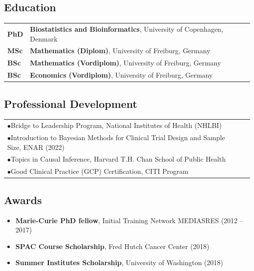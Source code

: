 \documentclass[a4paper,11pt]{article}
\def\he{\hspace{1ex}}
\begin{document}
\vspace{-0.3cm}
\subsection*{\large Education}\vspace{-0.2ex}
\he\begin{tabular}{ll p{6cm}}
	{\bf PhD} & {\bf Biostatistics and Bioinformatics}, University of Copenhagen, Denmark\\[0.2ex]
	{\bf MSc} & {\bf Mathematics (Diplom)}, University of Freiburg, Germany \\[0.2ex]
	{\bf BSc} & {\bf Mathematics (Vordiplom)}, University of Freiburg, Germany \\[0.2ex]
	{\bf BSc} & {\bf Economics (Vordiplom)}, University of Freiburg, Germany
\end{tabular}

\vspace{-0.3cm}
\subsection*{\large Professional Development}\vspace{-0.5ex}
\he\begin{tabular}{l p{6cm}}
$\bullet$\he Bridge to Leadership Program, National Institutes of Health (NHLBI) \\[0.2ex]
$\bullet$\he Introduction to Bayesian Methods for Clinical Trial Design and Sample Size, ENAR (2022) \\[0.2ex] 
$\bullet$\he Topics in Causal Inference, Harvard T.H. Chan School of Public Health \\[0.2ex] 
$\bullet$\he Good Clinical Practice (GCP) Certification, CITI Program
\end{tabular}

\pagebreak

\subsection*{\large Awards}\vspace{-0.6ex}
\begin{itemize}
	\item {\bf Marie-Curie PhD fellow}, Initial Training Network MEDIASRES (2012 -- 2017)\\[-0.6cm]
	\item {\bf SPAC Course Scholarship}, Fred Hutch Cancer Center (2018)\\[-0.6cm]
	\item {\bf Summer Institutes Scholarship}, University of Washington (2018)
\end{itemize}
\vspace{-0.3cm}
\end{document}
